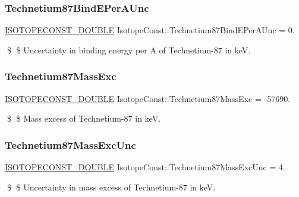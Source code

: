 \subsubsection{\texorpdfstring{Technetium87\+Bind\+E\+Per\+A\+Unc}{Technetium87BindEPerAUnc}}
{\footnotesize\ttfamily \mbox{\hyperlink{group___isotope_const-_macros_ga8f45a7272ce02c0b4c65c44636ed719a}{I\+S\+O\+T\+O\+P\+E\+C\+O\+N\+S\+T\+\_\+\+D\+O\+U\+B\+LE}} Isotope\+Const\+::\+Technetium87\+Bind\+E\+Per\+A\+Unc = 0.}

\$ \$ Uncertainty in binding energy per A of Technetium-\/87 in keV. \mbox{\label{group___isotope_const-_technetium-_tc87_gaeb626d9c87423bec18f554e8b364d2cb}} 
\subsubsection{\texorpdfstring{Technetium87\+Mass\+Exc}{Technetium87MassExc}}
{\footnotesize\ttfamily \mbox{\hyperlink{group___isotope_const-_macros_ga8f45a7272ce02c0b4c65c44636ed719a}{I\+S\+O\+T\+O\+P\+E\+C\+O\+N\+S\+T\+\_\+\+D\+O\+U\+B\+LE}} Isotope\+Const\+::\+Technetium87\+Mass\+Exc = -\/57690.}

\$ \$ Mass excess of Technetium-\/87 in keV. \mbox{\label{group___isotope_const-_technetium-_tc87_gae9d539c7f737af29f31777b686c8f0bd}} 
\subsubsection{\texorpdfstring{Technetium87\+Mass\+Exc\+Unc}{Technetium87MassExcUnc}}
{\footnotesize\ttfamily \mbox{\hyperlink{group___isotope_const-_macros_ga8f45a7272ce02c0b4c65c44636ed719a}{I\+S\+O\+T\+O\+P\+E\+C\+O\+N\+S\+T\+\_\+\+D\+O\+U\+B\+LE}} Isotope\+Const\+::\+Technetium87\+Mass\+Exc\+Unc = 4.}

\$ \$ Uncertainty in mass excess of Technetium-\/87 in keV. \mbox{\label{group___isotope_const-_technetium-_tc87_ga1131d1cbf5a165b6c5bbb20fe1379cb3}} 
